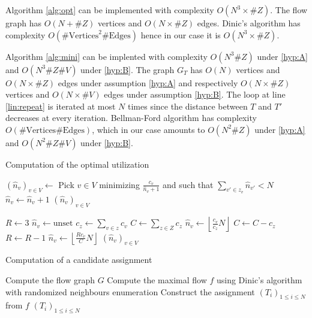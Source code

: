 \documentclass[]{article}
\begin{document}
Algorithm \ref{alg:opt} can be implemented with complexity $O(N^3\times \#Z)$. The flow graph has $O(N+\#Z)$ vertices and $O(N\times \#Z)$ edges. Dinic's algorithm has complexity $O(\#\mathrm{Vertices}^2\#\mathrm{Edges})$ hence in our case it is $O(N^3\times \#Z)$.
 
Algorithm \ref{alg:mini} can be implented with complexity $O(N^3\# Z)$ under \eqref{hyp:A} and $O(N^3 \#Z \#V)$ under \eqref{hyp:B}.
The graph $G_T$ has $O(N)$ vertices and $O(N\times \#Z)$ edges under assumption \eqref{hyp:A} and respectively $O(N\times \#Z)$ vertices and $O(N\times \#V)$ edges under assumption \eqref{hyp:B}. The loop at line \ref{lin:repeat} is iterated at most $N$ times since the distance between $T$ and $T'$ decreases at every iteration. Bellman-Ford algorithm has complexity $O(\#\mathrm{Vertices}\#\mathrm{Edges})$, which in our case amounts to $O(N^2\# Z)$ under \eqref{hyp:A} and $O(N^2 \#Z \#V)$ under \eqref{hyp:B}.
 
\begin{algorithm}
	\caption{Computation of the optimal utilization}
	\label{alg:util}
	\begin{algorithmic}[1]
	\State $(\hat{n}_v)_{v\in V} \leftarrow $  \label{lin:subutil}
	 \label{lin:loopsub}
	\State Pick $v\in V$ minimizing $\frac{c_v}{\hat{n}_v+1}$ and such that
		$\sum_{v'\in z_v} \hat{n}_{v'} < N$ \label{lin:findmin}
		\State $\hat{n}_v \leftarrow \hat{n}_v+1$
	\EndWhile
	\State \Return $(\hat{n}_v)_{v\in V}$
\EndFunction
\State

		\State $R \leftarrow 3$
\State $\hat{n}_v \leftarrow \mathrm{unset}$
\EndFor
{}
\State $c_z \leftarrow \sum_{v\in z} c_v$
\EndFor
\State $C \leftarrow \sum_{z\in Z} c_z$
\State $\hat{n}_v \leftarrow \left\lfloor \frac{c_v}{c_z} N \right\rfloor$
\EndFor
\State $C \leftarrow C-c_z$
\State $R\leftarrow R-1$
\EndWhile
{}
\State $\hat{n}_v \leftarrow \left\lfloor \frac{Rc_v}{C} N \right\rfloor$
\EndIf
\EndFor
\State \Return $(\hat{n}_v)_{v\in V}$
\EndFunction
	\end{algorithmic}
\end{algorithm}

\begin{algorithm}
	\caption{Computation of a candidate assignment}
	\label{alg:opt}
	\begin{algorithmic}[1]
		\State Compute the flow graph $G$
		\State Compute the maximal flow $f$ using Dinic's algorithm with randomized neighbours enumeration
		\State Construct the assignment $(T_i)_{1\le i\le N}$ from $f$
		\State \Return $(T_i)_{1\le i\le N}$
		\EndFunction
	\end{algorithmic}
\end{algorithm}
\end{document}
